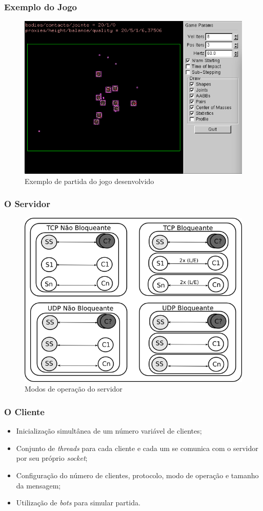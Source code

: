 \documentclass{beamer}
\begin{document}
\begin{frame} \frametitle{Exemplo do Jogo}
\begin{figure}[ht]
  \centering
  \includegraphics[width=.7\textwidth]{img/partida.png}
  \caption{Exemplo de partida do jogo desenvolvido}
  \label{fig:partida}
\end{figure}
\end{frame}

\begin{frame} \frametitle{O Servidor}
\begin{figure}[ht]
  \centering
  \includegraphics[width=.6\textwidth]{img/server.png}
  \caption{Modos de operação do servidor}
  \label{fig:server}
\end{figure}	
\end{frame}

\begin{frame} \frametitle{O Cliente}
\begin{itemize}
	\item \justifying Inicialização simultânea de um número variável de clientes;
	\item \justifying Conjunto de \textit{threads} para cada cliente e cada um se comunica com o servidor por seu próprio \textit{socket};
	\item \justifying Configuração do número de clientes, protocolo, modo de operação e tamanho da mensagem;
	\item \justifying Utilização de \emph{bots} para simular partida.
\end{itemize}
\end{frame}
\end{document}
